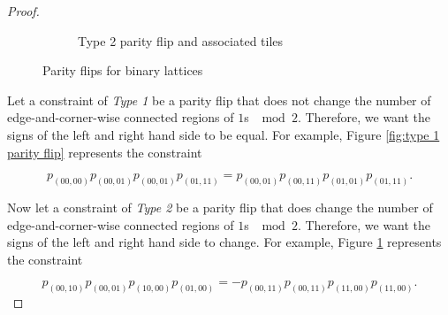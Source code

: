 \documentclass[12pt]{article}
\theoremstyle{plain}
\theoremstyle{definition}
\theoremstyle{remark}
\theoremstyle{definition}
\newcommand{\cell}[4]{ \draw[thick] ( #1 , #2 ) rectangle ( #3 , #4 );}
\newcommand{\cellA}[4]{\draw[red, thick, densely dotted] ( #1 + 0.5 , #2 ) arc(0:90:{0.5}); \draw[thick] ( #1 , #2 ) rectangle ( #3 , #4 );}
\newcommand{\cellB}[4]{\draw[red, thick, densely dotted] ( #1 + 1 , #2 + 0.5 ) arc(90:180:{0.5}); \draw[thick] ( #1 , #2 ) rectangle ( #3 , #4 );}
\newcommand{\cellC}[4]{\draw[red, thick, densely dotted] ( #1 + 0.5, #2 + 1 ) arc(180:270:{0.5}); \draw[thick] ( #1 , #2 ) rectangle ( #3 , #4 );}
\newcommand{\cellD}[4]{\draw[red, thick, densely dotted] ( #1 , #2 + 0.5 ) arc(-90:0:{0.5}); \draw[thick] ( #1 , #2 ) rectangle ( #3 , #4 );}
\newcommand{\cellE}[4]{\draw[red, thick, densely dotted] (#3, #4 * 0.5 + #2 * 0.5) -- (#1, #4 * 0.5 + #2 * 0.5); \draw[thick] ( #1 , #2 ) rectangle ( #3 , #4 );}
\newcommand{\lablnode}[3]{\node[shape=circle,draw=none,fill=none, inner sep=0pt,minimum size=0pt] (A) at ( #1 , #2 ) {#3};}
\newcommand{\lablvertex}[3]{\node[shape=circle,draw=none,fill=white, inner sep=2pt,minimum size=5pt] (A) at ( #1 , #2 ) {#3};}
\begin{document}
\begin{proof}
\begin{figure}[h!]
\begin{center}
\begin{subfigure}{0.4\textwidth}
    \caption{Type 2 parity flip and associated tiles}
    \label{fig:type 2 parity flip}
\end{subfigure}

\end{center}
\caption{Parity flips for binary lattices}
\label{fig:messy mosaic example}
\end{figure}

Let a constraint of \textit{Type 1} be a parity flip that does not change the number of edge-and-corner-wise connected regions of $1$s $\mod 2$. Therefore, we want the signs of the left and right hand side to be equal. For example, Figure \ref{fig:type 1 parity flip} represents the constraint

\begin{equation}
    p_{(00,00)}p_{(00,01)}p_{(00,01)}p_{(01,11)} = p_{(00,01)}p_{(00,11)}p_{(01,01)}p_{(01,11)}.
\end{equation}

Now let a constraint of \textit{Type 2} be a parity flip that does change the number of edge-and-corner-wise connected regions of $1$s $\mod 2$. Therefore, we want the signs of the left and right hand side to change. For example, Figure \ref{fig:type 2 parity flip} represents the constraint

\begin{equation}
    p_{(00,10)}p_{(00,01)}p_{(10,00)}p_{(01,00)} = -p_{(00,11)}p_{(00,11)}p_{(11,00)}p_{(11,00)}.
\end{equation}


\end{proof}
\end{document}
